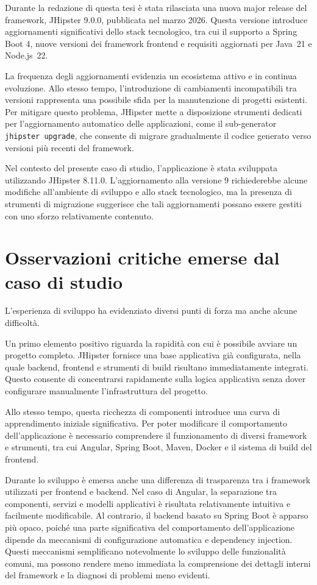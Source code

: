Durante la redazione di questa tesi è stata rilasciata una nuova major release del framework, JHipster 9.0.0, pubblicata nel marzo 2026. Questa versione introduce aggiornamenti significativi dello stack tecnologico, tra cui il supporto a Spring Boot 4, nuove versioni dei framework frontend e requisiti aggiornati per Java~21 e Node.js~22.

La frequenza degli aggiornamenti evidenzia un ecosistema attivo e in continua evoluzione. Allo stesso tempo, l'introduzione di cambiamenti incompatibili tra versioni rappresenta una possibile sfida per la manutenzione di progetti esistenti. Per mitigare questo problema, JHipster mette a disposizione strumenti dedicati per l'aggiornamento automatico delle applicazioni, come il sub-generator \texttt{jhipster upgrade}, che consente di migrare gradualmente il codice generato verso versioni più recenti del framework.

Nel contesto del presente caso di studio, l'applicazione è stata sviluppata utilizzando JHipster 8.11.0. L'aggiornamento alla versione 9 richiederebbe alcune modifiche all'ambiente di sviluppo e allo stack tecnologico, ma la presenza di strumenti di migrazione suggerisce che tali aggiornamenti possano essere gestiti con uno sforzo relativamente contenuto.

\section{Osservazioni critiche emerse dal caso di studio}
\label{sec:evaluation-observations}

L’esperienza di sviluppo ha evidenziato diversi punti di forza ma anche alcune difficoltà.

Un primo elemento positivo riguarda la rapidità con cui è possibile avviare un progetto completo. JHipster fornisce una base applicativa già configurata, nella quale backend, frontend e strumenti di build risultano immediatamente integrati. Questo consente di concentrarsi rapidamente sulla logica applicativa senza dover configurare manualmente l’infrastruttura del progetto.

Allo stesso tempo, questa ricchezza di componenti introduce una curva di apprendimento iniziale significativa. Per poter modificare il comportamento dell’applicazione è necessario comprendere il funzionamento di diversi framework e strumenti, tra cui Angular, Spring Boot, Maven, Docker e il sistema di build del frontend.

Durante lo sviluppo è emersa anche una differenza di trasparenza tra i framework utilizzati per frontend e backend. Nel caso di Angular, la separazione tra componenti, servizi e modelli applicativi è risultata relativamente intuitiva e facilmente modificabile. Al contrario, il backend basato su Spring Boot è apparso più opaco, poiché una parte significativa del comportamento dell’applicazione dipende da meccanismi di configurazione automatica e dependency injection. Questi meccanismi semplificano notevolmente lo sviluppo delle funzionalità comuni, ma possono rendere meno immediata la comprensione dei dettagli interni del framework e la diagnosi di problemi meno evidenti.

